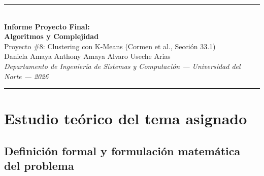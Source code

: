 \documentclass[11pt,letterpaper]{article}
\newif\ifportada
\numberwithin{equation}{section}
\theoremstyle{plain}
\newcommand{\bloqueCompacto}{%
  \begin{center}
    {\color{azul}\rule{\textwidth}{1.2pt}}\\[8pt]
    {\LARGE\bfseries\color{azul} Informe Proyecto Final:\\[2pt] Algoritmos y Complejidad}\\[6pt]
    {\large Proyecto \#8: Clustering con K-Means (Cormen et al., Sección 33.1)}\\[8pt]
    {\normalsize Daniela Amaya \quad Anthony Amaya \quad Alvaro Useche Arias}\\[3pt]
    {\small\itshape Departamento de Ingeniería de Sistemas y Computación — Universidad del Norte — 2026}\\[6pt]
    {\color{azul}\rule{\textwidth}{1.2pt}}
  \end{center}}
\newcommand{\portadaCompleta}{%
  \begin{titlepage}
  \thispagestyle{empty}
  \begin{tikzpicture}[remember picture,overlay]
    \fill[azul] (current page.north west) rectangle ([yshift=-4.4cm]current page.north east);
    \node[anchor=north west,text=white,align=left,inner sep=0pt]
      at ([xshift=2.5cm,yshift=-1.4cm]current page.north west)
      {{\Large\bfseries Universidad del Norte}\\[4pt]
       {\normalsize Departamento de Ingeniería de Sistemas y Computación}};
  \end{tikzpicture}
  \vspace*{5.4cm}
  \noindent{\color{azul}\bfseries\large INFORME PROYECTO FINAL}\\[2pt]
  {\color{grisoscuro}\large Algoritmos y Complejidad}\\[1.6cm]
  \noindent{\fontsize{30}{34}\selectfont\bfseries\color{azul} Clustering con K-Means}\\[0.5cm]
  {\Large Proyecto \#8 \;·\; Cormen et al., Sección 33.1}\\[0.4cm]
  {\color{azul}\rule{0.35\textwidth}{2pt}}
  \vfill
  \noindent{\bfseries\large Integrantes}\\[6pt]
  {\large Daniela Amaya\\ Anthony Amaya\\ Alvaro Useche Arias}\\[1.2cm]
  {\large 2026}
  \end{titlepage}}
\begin{document}

\ifportada
  \portadaCompleta
  \pagenumbering{roman}
  \tableofcontents
  \clearpage
  \pagenumbering{arabic}
\else
  \bloqueCompacto
\fi

\section{Estudio teórico del tema asignado}

\subsection{Definición formal y formulación matemática del problema}
\end{document}
